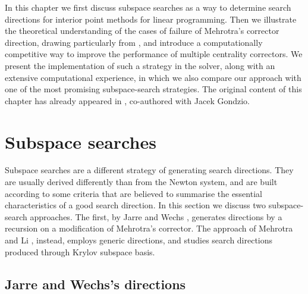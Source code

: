 
%
%
\label{ch:Correctors}

In this chapter we first discuss subspace searches as a way 
to determine search directions for interior point methods
for linear programming.
Then we illustrate the theoretical understanding of 
the cases of failure of Mehrotra's corrector direction,
drawing particularly from \cite{Cartis04,Cartis05}, 
and introduce a computationally competitive way
to improve the performance of multiple centrality correctors.
We present the implementation of such a strategy in the \HOPDM solver,
along with an extensive computational experience, in which
we also compare our approach with one of the most promising
subspace-search strategies.
The original content of this chapter has already appeared 
in \cite{ColomboGondzio05}, co-authored with Jacek Gondzio.


%
%
\section{Subspace searches}
\label{sec:SubspaceSearches}

Subspace searches are a different strategy of generating search 
directions. 
They are usually derived differently than from the Newton system, and 
are built according to some criteria that are believed to summarise
the essential characteristics of a good search direction.
In this section we discuss two subspace-search approaches. 
The first, by Jarre and Wechs \cite{JarreWechs}, generates directions
by a recursion on a modification of Mehrotra's corrector.
The approach of Mehrotra and Li \cite{MehrotraLi}, instead, 
employs generic directions, and studies search directions
produced through Krylov subspace basis.

%
%
\subsection{Jarre and Wechs's directions}
\label{sec:JarreWechs}

